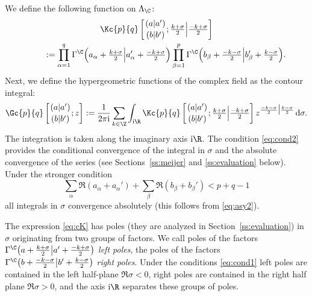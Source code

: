 We define the following function on $\Lambda_\C$:
\begin{gather}
\Kc{p}{q}\left[\genfrac{}{}{0pt}{}{(a|a')}{(b|b')};  \tfrac{k+\sigma}{2}\Bigl| \tfrac{-k+\sigma}{2}
\right]\nonumber\\
\qquad{} :=
 \prod_{\alpha=1}^q \Gamma^\C\Bigl(a_\alpha+\tfrac{k+\sigma}2\Bigl|a_\alpha'+\tfrac{-k+\sigma}2\Bigr)
 \prod_{\beta=1}^p \Gamma^\C\Bigl(b_\beta+\tfrac{-k-\sigma}2\Bigl|b_\beta'+\tfrac{k-\sigma}2\Bigr).
\label{eq:cK}
\end{gather}
Next, we define the hypergeometric functions of the complex field
as the contour integral:
\begin{equation}
\Gc{p}{q}\left[\genfrac{}{}{0pt}{}{(a|a')}{(b|b')};z\right]
:=\frac{1}{2\pi {\rm i}}
\sum_{k\in\Z} \int_{{\rm i}\R}
\Kc{p}{q}\left[\genfrac{}{}{0pt}{}{(a|a')}{(b|b')};\tfrac{k+\sigma}{2}\Bigl| \tfrac{-k+\sigma}{2}\right]
 z^{\frac{-k-\sigma}2\big| \frac{k-\sigma}2} \,{\rm d}\sigma.
 \label{eq:def}
\end{equation}
The integration is taken along the imaginary axis ${\rm i}\R$.
The condition \eqref{eq:cond2} provides the conditional convergence of
the integral in $\sigma$ and the absolute convergence of the series
(see Sections~\ref{ss:meijer} and \ref{ss:evaluation} below).
Under the stronger condition
\begin{equation}
\sum_\alpha \Re(a_\alpha+a_\alpha')+\sum_\beta\Re(b_\beta+b_\beta')<p+q-1
 \label{eq:cond3}
\end{equation}
all integrals in $\sigma$ convergence absolutely
(this follows from \eqref{eq:asy2}).

The expression \eqref{eq:cK} has poles (they are analyzed in
Section~\ref{ss:evaluation}) in $\sigma$ originating from two groups
of factors.
We call poles of the factors
$\Gamma^\C\big(a+\frac{k+\sigma}2\big|a'+\frac{-k+\sigma}2\big)$
\emph{left poles}, the poles of the factors
$\Gamma^\C\big(b+\frac{-k-\sigma}2\big|b'+\frac{k-\sigma}2\big)$
\emph{right poles}.
Under the conditions \eqref{eq:cond1} left poles are contained
in the left half-plane $\Re\sigma<0$,
right poles are contained in the right half plane $\Re\sigma>0$, and
the axis ${\rm i}\R$ separates these groups of poles.
